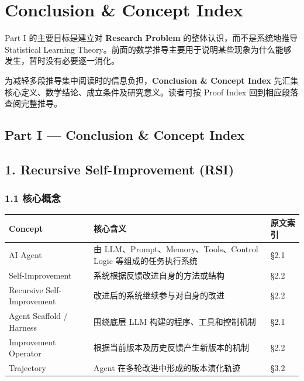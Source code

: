 \hypertarget{part-1-10-0001-conclusion-concept-index}{%
\section{Conclusion \& Concept Index}\label{part-1-10-0001-conclusion-concept-index}}

Part I 的主要目标是建立对 \textbf{Research Problem} 的整体认识，而不是系统地推导 Statistical Learning Theory。前面的数学推导主要用于说明某些现象为什么能够发生，暂时没有必要逐一消化。

为减轻多段推导集中阅读时的信息负担，\textbf{Conclusion \& Concept Index} 先汇集核心定义、数学结论、成立条件及研究意义。读者可按 Proof Index 回到相应段落查阅完整推导。

\hypertarget{part-1-10-0001-part-i-conclusion-concept-index}{%
\subsection{Part I --- Conclusion \& Concept Index}\label{part-1-10-0001-part-i-conclusion-concept-index}}

\hypertarget{part-1-10-0001-recursive-self-improvement-rsi}{%
\subsection{1. Recursive Self-Improvement (RSI)}\label{part-1-10-0001-recursive-self-improvement-rsi}}

\hypertarget{part-1-10-0001-ux6838ux5fc3ux6982ux5ff5}{%
\subsubsection{1.1 核心概念}\label{part-1-10-0001-ux6838ux5fc3ux6982ux5ff5}}

\begin{readertable}
\begin{longtable}[]{@{}
  >{\raggedright\arraybackslash}p{}
  >{\raggedright\arraybackslash}p{}
  >{\raggedright\arraybackslash}p{}@{}}
\toprule
Concept & 核心含义 & 原文索引 \\
\midrule
\endhead
AI Agent & 由 LLM、Prompt、Memory、Tools、Control Logic 等组成的任务执行系统 & §2.1 \\
Self-Improvement & 系统根据反馈改进自身的方法或结构 & §2.2 \\
Recursive Self-Improvement & 改进后的系统继续参与对自身的改进 & §2.2 \\
Agent Scaffold / Harness & 围绕底层 LLM 构建的程序、工具和控制机制 & §2.1 \\
Improvement Operator & 根据当前版本及历史反馈产生新版本的机制 & §2.2 \\
Trajectory & Agent 在多轮改进中形成的版本演化轨迹 & §3.2 \\
\bottomrule
\end{longtable}
\end{readertable}

